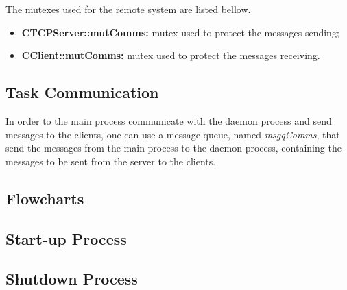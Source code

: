 The mutexes used for the remote system are listed bellow.

\begin{itemize}
	\item \textbf{CTCPServer::mutComms:} mutex used to protect the messages sending;
	\item \textbf{CClient::mutComms:} mutex used to protect the messages receiving.
\end{itemize}

\subsection{Task Communication}
In order to the main process communicate with the daemon process and send messages to the clients, one can use a message queue, named \textit{msgqComms}, that send the messages from the main process to the daemon process, containing the messages to be sent from the server to the clients.

\subsection{Flowcharts}


\subsection{Start-up Process}

\subsection{Shutdown Process}
